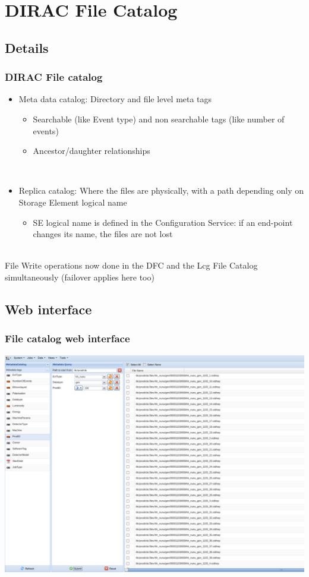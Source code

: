 \documentclass[10pt,table,dvipsnames]{beamer}
\begin{document}
\section{DIRAC File Catalog}
\label{sec:fc}

\subsection{Details}
\label{sec:fcdetails}

\begin{frame}
  \frametitle{DIRAC File catalog}
\begin{itemize}
\item Meta data catalog: {\color{NavyBlue}Directory and file level meta tags}
  \begin{itemize}
  \item Searchable (like Event type) and non searchable tags (like number of events)
  \item {\color{ForestGreen}Ancestor/daughter relationships}
  \end{itemize}
~\\
\item {\color{NavyBlue}Replica catalog}: Where the files are physically, with a path
  depending only on Storage Element logical name
  \begin{itemize}
  \item SE logical name is defined in the Configuration Service: {\color{ForestGreen}if an
    end-point changes its name, the files are not lost}
  \end{itemize}
\end{itemize}
~\\
File {\color{NavyBlue}Write operations} now done {\color{NavyBlue}in the DFC and the Lcg File Catalog}
simultaneously (failover applies here too)
\end{frame}

\subsection{Web interface}
\label{sec:webfc}

\begin{frame}
  \frametitle{File catalog web interface}
\centering
\includegraphics[width=.9\textwidth]{WebFC}~\\
\end{frame}
\end{document}
